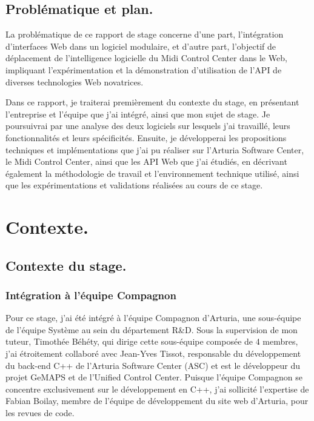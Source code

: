 \documentclass[francais]{rapportPFE}  %
\begin{document}
\subsection{Problématique et plan.}

La problématique de ce rapport de stage concerne d'une part, l'intégration d'interfaces Web dans un logiciel modulaire, et d'autre part, l'objectif de déplacement de l'intelligence logicielle du Midi Control Center dans le Web, impliquant l'expérimentation et la démonstration d'utilisation de l'API de diverses technologies Web novatrices.

Dans ce rapport, je traiterai premièrement du contexte du stage, en présentant l'entreprise et l'équipe que j'ai intégré, ainsi que mon sujet de stage. Je poursuivrai par une analyse des deux logiciels sur lesquels j'ai travaillé, leurs fonctionnalités et leurs spécificités. Ensuite, je développerai les propositions techniques et implémentations que j'ai pu réaliser sur l'Arturia Software Center, le Midi Control Center, ainsi que les API Web que j'ai étudiés, en décrivant également la méthodologie de travail et l'environnement technique utilisé, ainsi que les expérimentations et validations réalisées au cours de ce stage.


\section{Contexte.}

\subsection{Contexte du stage.}
\subsubsection{Intégration à l'équipe Compagnon}
Pour ce stage, j'ai été intégré à l'équipe Compagnon d'Arturia, une sous-équipe de l'équipe Système au sein du département R\&D. Sous la supervision de mon tuteur, Timothée Béhéty, qui dirige cette sous-équipe composée de 4 membres, j'ai étroitement collaboré avec Jean-Yves Tissot, responsable du développement du back-end C++ de l'Arturia Software Center (ASC) et est le développeur du projet GeMAPS et de l'Unified Control Center. Puisque l'équipe Compagnon se concentre exclusivement sur le développement en C++, j'ai sollicité l'expertise de Fabian Boilay, membre de l'équipe de développement du site web d'Arturia, pour les revues de code. 
\end{document}
